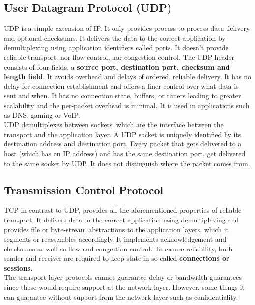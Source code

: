 \subsection{User Datagram Protocol (UDP)}
UDP is a simple extension of IP. It only provides process-to-process data delivery and optional checksums. It delivers the data to the correct application by demultiplexing using application identifiers called ports. It doesn't provide reliable transport, nor flow control, nor congestion control. The UDP header consists of four fields, a \textbf{source port, destination port, checksum and length field}. It avoids overhead and delays of ordered, reliable delivery. It has no delay for connection establishment and offers a finer control over what data is sent and when. It has no connection state, buffers, or timers leading to greater scalability and the per-packet overhead is minimal. It is used in applications such as DNS, gaming or VoIP.\\
UDP demultiplexes between sockets, which are the interface between the transport and the application layer. A UDP socket is uniquely identified by its destination address and destination port. Every packet that gets delivered to a host (which has an IP address) and has the same destination port, get delivered to the same socket by UDP. It does not distinguish where the packet comes from.

\subsection{Transmission Control Protocol}
TCP in contrast to UDP, provides all the aforementioned properties of reliable transport. It delivers data to the correct application using demultiplexing and provides file or byte-stream abstractions to the application layers, which it segments or reassembles accordingly. It implements acknowledgement and checksums as well as flow and congestion control. To ensure reliability, both sender and receiver are required to keep state in so-called \textbf{connections or sessions.} \\
The transport layer protocols cannot guarantee delay or bandwidth guarantees since those would require support at the network layer. However, some things it can guarantee without support from the network layer such as confidentiality.

